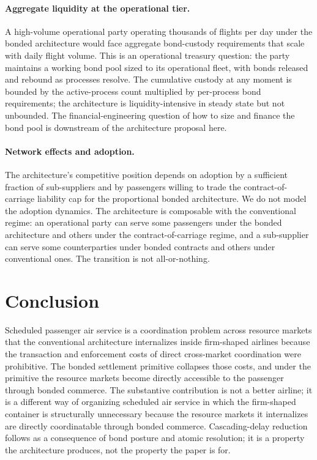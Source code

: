 \documentclass[11pt,a4paper]{article}
\theoremstyle{definition}
\theoremstyle{remark}
\begin{document}
\paragraph{Aggregate liquidity at the operational tier.}
A high-volume operational party operating thousands of flights
per day under the bonded architecture would face aggregate
bond-custody requirements that scale with daily flight volume.
This is an operational treasury question: the party maintains a
working bond pool sized to its operational fleet, with bonds
released and rebound as processes resolve. The cumulative custody
at any moment is bounded by the active-process count multiplied
by per-process bond requirements; the architecture is
liquidity-intensive in steady state but not unbounded. The
financial-engineering question of how to size and finance the
bond pool is downstream of the architecture proposal here.

\paragraph{Network effects and adoption.}
The architecture's competitive position depends on adoption by a
sufficient fraction of sub-suppliers and by passengers willing to
trade the contract-of-carriage liability cap for the proportional
bonded architecture. We do not model the adoption dynamics. The
architecture is composable with the conventional regime: an
operational party can serve some passengers under the bonded
architecture and others under the contract-of-carriage regime,
and a sub-supplier can serve some counterparties under bonded
contracts and others under conventional ones. The transition is
not all-or-nothing.

\section{Conclusion}
\label{sec:conclusion}

Scheduled passenger air service is a coordination problem across
resource markets that the conventional architecture internalizes
inside firm-shaped airlines because the transaction and
enforcement costs of direct cross-market coordination were
prohibitive. The bonded settlement primitive collapses those
costs, and under the primitive the resource markets become
directly accessible to the passenger through bonded commerce. The
substantive contribution is not a better airline; it is a
different way of organizing scheduled air service in which the
firm-shaped container is structurally unnecessary because the
resource markets it internalizes are directly coordinatable
through bonded commerce. Cascading-delay reduction follows as a
consequence of bond posture and atomic resolution; it is a
property the architecture produces, not the property the paper is
for.
\end{document}
